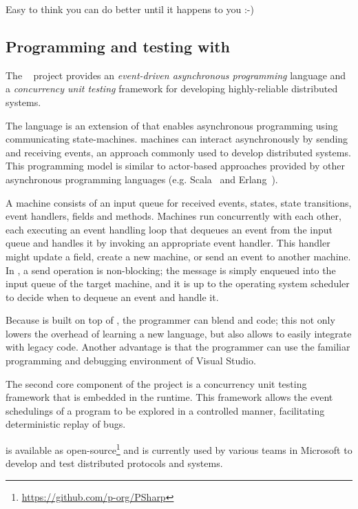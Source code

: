 Easy to think you can do better until it happens to you :-)

\subsection{Programming and testing with \psharp}
\label{bg:psharp}

The \psharp~\cite{deligiannis2015psharp} project provides an \emph{event-driven asynchronous programming} language and a \emph{concurrency unit testing} framework for developing highly-reliable distributed systems.

The \psharp language is an extension of \csharp that enables asynchronous programming using communicating state-machines. \psharp machines can interact asynchronously by sending and receiving events, an approach commonly used to develop distributed systems. This programming model is similar to actor-based approaches provided by other asynchronous programming languages (e.g. Scala~\cite{odersky2008programming} and Erlang~\cite{armstrong1996erlang}).

A \psharp machine consists of an input queue for received events, states, state transitions, event handlers, fields and methods. Machines run concurrently with each other, each executing an event handling loop that dequeues an event from the input queue and handles it by invoking an appropriate event handler. This handler might update a field, create a new machine, or send an event to another machine. In \psharp, a send operation is non-blocking; the message is simply enqueued into the input queue of the target machine, and it is up to the operating system scheduler to decide when to dequeue an event and handle it.

Because \psharp is built on top of \csharp, the programmer can blend \psharp and \csharp code; this not only lowers the overhead of learning a new language, but also allows \psharp to easily integrate with legacy code. Another advantage is that the programmer can use the familiar programming and debugging environment of Visual Studio.

The second core component of the \psharp project is a concurrency unit testing framework that is embedded in the \psharp runtime. This framework allows the event schedulings of a \psharp program to be explored in a controlled manner, facilitating deterministic replay of bugs.

\psharp is available as open-source\footnote{\url{https://github.com/p-org/PSharp}} and is currently used by various teams in Microsoft to develop and test distributed protocols and systems.

